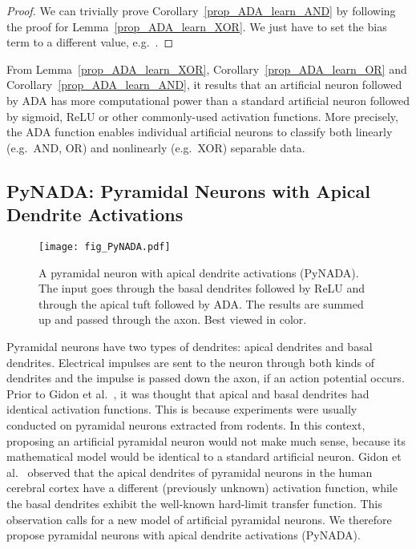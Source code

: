 \documentclass[pdflatex,sn-mathphys]{sn-jnl}
\theoremstyle{thmstyleone}
\theoremstyle{thmstyletwo}\newtheorem{example}{Example}\newtheorem{remark}{Remark}
\theoremstyle{thmstylethree}\newtheorem{definition}{Definition}\DeclareMathOperator{\sinc}{sinc}
\begin{document}
\begin{proof}
We can trivially prove Corollary~\ref{prop_ADA_learn_AND} by following the proof for Lemma~\ref{prop_ADA_learn_XOR}. We just have to set the bias term to a different value, e.g.~.
\end{proof}

From Lemma~\ref{prop_ADA_learn_XOR}, Corollary~\ref{prop_ADA_learn_OR} and Corollary~\ref{prop_ADA_learn_AND}, it results that an artificial neuron followed by ADA has more computational power than a standard artificial neuron followed by sigmoid, ReLU or other commonly-used activation functions. More precisely, the ADA function enables individual artificial neurons to classify both linearly (e.g.~AND, OR) and nonlinearly (e.g.~XOR) separable data.

\subsection{PyNADA: Pyramidal Neurons with Apical Dendrite Activations}
\label{sec_method_PyNADA}

\begin{figure}[!t]
\begin{center}
\centerline{\texttt{[image: fig\_PyNADA.pdf]}}
\caption{A pyramidal neuron with apical dendrite activations (PyNADA). The input  goes through the basal dendrites followed by ReLU and through the apical tuft followed by ADA. The results are summed up and passed through the axon. Best viewed in color.}
\label{fig_PyNADA}
\end{center}
\end{figure}

Pyramidal neurons have two types of dendrites: apical dendrites and basal dendrites. Electrical impulses are sent to the neuron through both kinds of dendrites and the impulse is passed down the axon, if an action potential occurs. Prior to Gidon et al.~\cite{Gidon-S-2020}, it was thought that apical and basal dendrites had identical activation functions. This is because experiments were usually conducted on pyramidal neurons extracted from rodents. In this context, proposing an artificial pyramidal neuron would not make much sense, because its mathematical model would be identical to a standard artificial neuron. Gidon et al.~\cite{Gidon-S-2020} observed that the apical dendrites of pyramidal neurons in the human cerebral cortex have a different (previously unknown) activation function, while the basal dendrites exhibit the well-known hard-limit transfer function. This observation calls for a new model of artificial pyramidal neurons. We therefore propose pyramidal neurons with apical dendrite activations (PyNADA).
\end{document}

